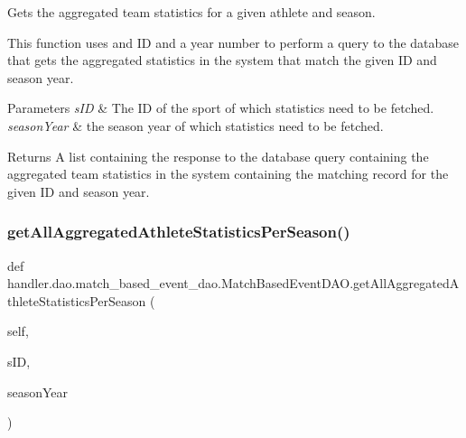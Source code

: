 Gets the aggregated team statistics for a given athlete and season. 

This function uses and ID and a year number to perform a query to the database that gets the aggregated statistics in the system that match the given ID and season year.


\begin{DoxyParams}{Parameters}
{\em s\+ID} & The ID of the sport of which statistics need to be fetched. \\
\hline
{\em season\+Year} & the season year of which statistics need to be fetched.\\
\hline
\end{DoxyParams}
\begin{DoxyReturn}{Returns}
A list containing the response to the database query containing the aggregated team statistics in the system containing the matching record for the given ID and season year. 
\end{DoxyReturn}
\mbox{\label{classhandler_1_1dao_1_1match__based__event__dao_1_1_match_based_event_d_a_o_a0ffef87d28ae72c4064417cdf73ce7b0}} 
\subsubsection{\texorpdfstring{get\+All\+Aggregated\+Athlete\+Statistics\+Per\+Season()}{getAllAggregatedAthleteStatisticsPerSeason()}}
{\footnotesize\ttfamily def handler.\+dao.\+match\+\_\+based\+\_\+event\+\_\+dao.\+Match\+Based\+Event\+D\+A\+O.\+get\+All\+Aggregated\+Athlete\+Statistics\+Per\+Season (\begin{DoxyParamCaption}\item[{}]{self,  }\item[{}]{s\+ID,  }\item[{}]{season\+Year }\end{DoxyParamCaption})}



